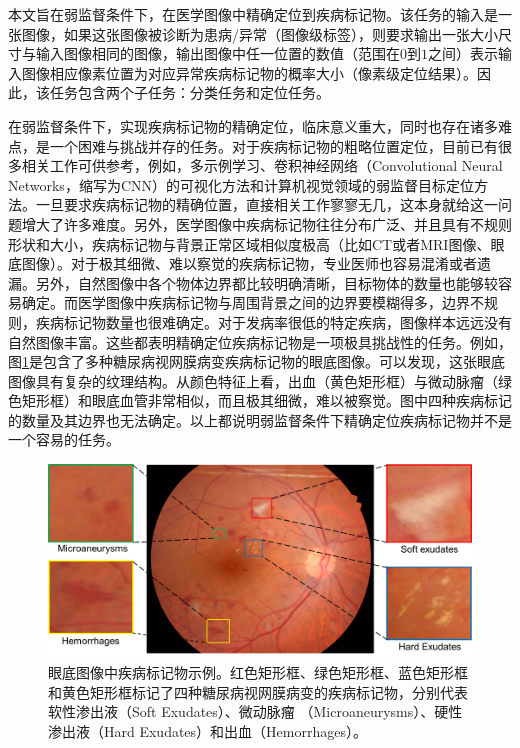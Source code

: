本文旨在弱监督条件下，在医学图像中精确定位到疾病标记物。该任务的输入是一张图像，如果这张图像被诊断为患病/异常（图像级标签），则要求输出一张大小尺寸与输入图像相同的图像，输出图像中任一位置的数值（范围在$0$到$1$之间）表示输入图像相应像素位置为对应异常疾病标记物的概率大小（像素级定位结果）。因此，该任务包含两个子任务：分类任务和定位任务。

在弱监督条件下，实现疾病标记物的精确定位，临床意义重大，同时也存在诸多难点，是一个困难与挑战并存的任务。对于疾病标记物的粗略位置定位，目前已有很多相关工作可供参考，例如，多示例学习、卷积神经网络（Convolutional Neural Networks，缩写为CNN）的可视化方法和计算机视觉领域的弱监督目标定位方法。一旦要求疾病标记物的精确位置，直接相关工作寥寥无几，这本身就给这一问题增大了许多难度。另外，医学图像中疾病标记物往往分布广泛、并且具有不规则形状和大小，疾病标记物与背景正常区域相似度极高（比如CT或者MRI图像、眼底图像）。对于极其细微、难以察觉的疾病标记物，专业医师也容易混淆或者遗漏。另外，自然图像中各个物体边界都比较明确清晰，目标物体的数量也能够较容易确定。而医学图像中疾病标记物与周围背景之间的边界要模糊得多，边界不规则，疾病标记物数量也很难确定。对于发病率很低的特定疾病，图像样本远远没有自然图像丰富。这些都表明精确定位疾病标记物是一项极具挑战性的任务。例如，图\ref{fig:biomarker_localization_example}是包含了多种糖尿病视网膜病变疾病标记物的眼底图像。可以发现，这张眼底图像具有复杂的纹理结构。从颜色特征上看，出血（黄色矩形框）与微动脉瘤（绿色矩形框）和眼底血管非常相似，而且极其细微，难以被察觉。图中四种疾病标记的数量及其边界也无法确定。以上都说明弱监督条件下精确定位疾病标记物并不是一个容易的任务。
\begin{figure}[h]
	\centering
	\includegraphics[width=1.0\textwidth]{figure/biomarker_localization_example}
	\caption{眼底图像中疾病标记物示例。红色矩形框、绿色矩形框、蓝色矩形框和黄色矩形框标记了四种糖尿病视网膜病变的疾病标记物，分别代表软性渗出液（Soft Exudates）、微动脉瘤
		（Microaneurysms）、硬性渗出液（Hard Exudates）和出血（Hemorrhages）。} 
	\label{fig:biomarker_localization_example}
\end{figure}

